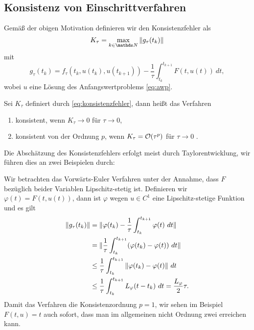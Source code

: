 \subsection{Konsistenz von Einschrittverfahren} 
%
Gemäß der obigen Motivation definieren wir den Konsistenzfehler als
%
\begin{equation} \label{eq:konsistenzfehler} 
K_\tau = \max_{k\in\N} \Vert g_\tau(t_k) \Vert 
\end{equation}
%
mit 
%
\begin{equation}
g_\tau(t_k) = f_\tau(t_k,u(t_k),u(t_{k+1})) - \frac{1}\tau \int_{t_k}^{t_{k+1}} F(t,u(t))~dt,
\end{equation}
%
wobei $u$ eine Lösung des Anfangswertproblems \eqref{eq:awp}.
%
\begin{definition}{}{}
Sei $K_\tau$ definiert durch \eqref{eq:konsistenzfehler}, dann heißt das Verfahren
%
\begin{enumerate}[label=(\roman*)]
\item konsistent, wenn $K_\tau \rightarrow 0$ für $\tau \rightarrow 0$,
%
\item konsistent von der Ordnung $p$, wenn $K_\tau = {\cal O}(\tau^p)$ für $\tau \rightarrow 0$ . 
\end{enumerate}
\end{definition}
%
Die Abschätzung des Konsistenzfehlers erfolgt meist durch Taylorentwicklung, wir führen dies an zwei Beispielen durch:
%
\begin{example}{}{}
Wir betrachten das Vorwärts-Euler Verfahren unter der Annahme, dass $F$ bezüglich beider Variablen Lipschitz-stetig ist. Definieren wir $\varphi(t) = F(t,u(t))$, dann ist $\varphi$ wegen $u \in C^1$ eine Lipschitz-stetige Funktion und es gilt
%
\begin{align*} 
\|g_\tau(t_k)\| &= \|\varphi(t_k) - \frac{1}\tau \int_{t_k}^{t_{k+1}} \varphi(t)~dt\|\\
&= \|\frac{1}\tau \int_{t_k}^{t_{k+1}} (\varphi(t_k)-\varphi(t))~dt\|\\
&\leq\frac{1}\tau \int_{t_k}^{t_{k+1}} \|\varphi(t_k)-\varphi(t)\|~dt   \\
&\leq \frac{1}\tau \int_{t_k}^{t_{k+1}} L_\varphi ( t-t_k)~dt = \frac{L_\varphi}2 \tau.
\end{align*}
%
Damit das Verfahren die Konsistenzordnung $p=1$, wir sehen im Beispiel $F(t,u) = t$ auch sofort, dass man im allgemeinen nicht Ordnung zwei erreichen kann. 
\end{example}
%
%

